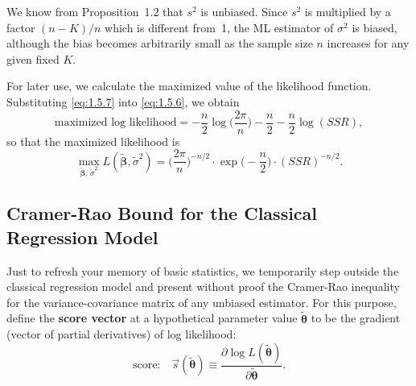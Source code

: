 We know from Proposition~1.2 that $s^2$ is unbiased.  Since $s^2$ is multiplied by a
factor $(n - K)/n$ which is different from~1, the ML estimator of $\sigma^2$ is biased,
although the bias becomes arbitrarily small as the sample size $n$ increases for any given
fixed $K$.

For later use, we calculate the maximized value of the likelihood function.  Substituting
\eqref{eq:1.5.7} into \eqref{eq:1.5.6}, we obtain
%
\[
  \text{maximized log likelihood}
    = -\frac{n}{2}\log\!\biggl(\frac{2\pi}{n}\biggr)
      - \frac{n}{2}
      - \frac{n}{2}\log(SSR),
\]
%
so that the maximized likelihood is
%
\begin{equation}
  \max_{\widetilde{\bm{\beta}},\, \tilde{\sigma}^2}
    L(\widetilde{\bm{\beta}}, \tilde{\sigma}^2)
    = \biggl(\frac{2\pi}{n}\biggr)^{-n/2}
      \cdot \exp\!\biggl(-\frac{n}{2}\biggr)
      \cdot (SSR)^{-n/2}.
  \label{eq:1.5.8}
\end{equation}

\subsection*{Cramer-Rao Bound for the Classical Regression Model}

Just to refresh your memory of basic statistics, we temporarily step outside the classical
regression model and present without proof the Cramer-Rao inequality for the
variance-covariance matrix of any unbiased estimator.  For this purpose, define the
\textbf{score vector} at a hypothetical parameter value $\tilde{\bm{\theta}}$ to be the
gradient (vector of partial derivatives) of log likelihood:
%
\begin{equation}
  \text{score:}\quad
  \vec{s}(\tilde{\bm{\theta}})
    \equiv \frac{\partial \log L(\tilde{\bm{\theta}})}
                {\partial \tilde{\bm{\theta}}}.
  \label{eq:1.5.9}
\end{equation}


